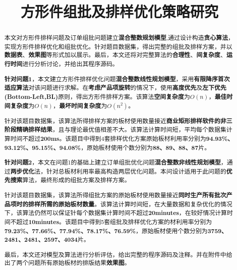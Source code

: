 \documentclass[bwprint]{gmcmthesis}
\title{方形件组批及排样优化策略研究}
\begin{document}
\sloppy

 \maketitle

\begin{abstract}
本文对方形件排样问题及订单组批问题建立\textbf{混合整数规划模型},通过设计构造\textbf{贪心算法}，实现方形件排样优化和组批优化。针对题目数据集，得出完整的组批及排样方案，并以\textbf{数据表}、\textbf{效果图}等形式加以展示。最后，本文还将对完整算法的\textbf{合理性}、\textbf{间复杂度}、\textbf{运行时间}进行分析讨论，并给出其程序源码。

\textbf{针对问题1}，本文建立方形件排样优化问题\textbf{混合整数线性规划模型}，采用\textbf{有限降序首次适应算法}对该问题进行求解。在\textbf{考虑产品项旋转}的情况下，使用\textbf{高度优先}及\textbf{左下优先(Bottom-Left,BL)}原则，得出方形件排样方案。该算法\textbf{空间复杂度}为$O(n)$，\textbf{最佳时间复杂度}为$O(n)$，\textbf{最坏时间复杂度}为$O(n^2)$。

针对该题目数据集，该算法所得排样方案的板材使用数量接近\textbf{商业矩形排样软件的非三阶段精确排样结果}，且与理论最优值相差不大。该算法计算时间短，平均每个数据集计算时间不超过\textbf{200ms}。该题目中得到4套排样优化方案原始板材利用率分别为\textbf{94.93\%、93.12\%、95.15\%、94.08\%}，原始板材使用个数分别为\textbf{88、89、88、87}片。

\textbf{针对问题2}，本文在问题1的基础上建立订单组批优化问题\textbf{混合整数非线性规划模型}，通过\textbf{两步优化}法，针对总板材利用率最高构造两层优化问题。本问设计适用于此问题的\textbf{优先搜索}算法，最终形成的组批方案及排样方案。

针对该题目数据集，该算法所得组批方案的原始板材使用数量接近\textbf{同时生产所有批次产品项时的排样所需的原始板材数量}。该算法计算时间短，在大量数据和复杂优化的情况下，该算法仍然可以保证针每个数据集计算时间不超过\textbf{20minutes}，在较好情况计算时间不超过\textbf{10minutes}。该题目中得到5套组批及排样优化方案的材利用率分别为\textbf{79.23\%、77.66\%、77.94\%、78.17\%、76.59\%}，原始板材使用个数分别为\textbf{3759、2481、2481、2597、4034}片。

最后，本文还对模型及算法进行分析评估，给出完整的程序源码及注释。并在附件中给出了两个问题所有原始板材的排版结果\textbf{效果图}。

\end{abstract}
\end{document}
